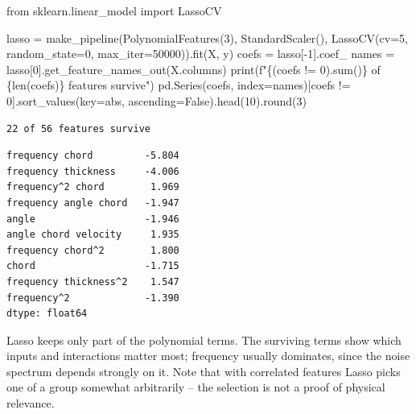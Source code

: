 \documentclass[
  letterpaper,
  DIV=11,
  numbers=noendperiod]{scrreprt}
\newenvironment{Shaded}{\begin{snugshade}}{\end{snugshade}}
\newcommand{\BuiltInTok}[1]{\textcolor[rgb]{0.00,0.23,0.31}{#1}}
\newcommand{\DecValTok}[1]{\textcolor[rgb]{0.68,0.00,0.00}{#1}}
\newcommand{\ImportTok}[1]{\textcolor[rgb]{0.00,0.46,0.62}{#1}}
\newcommand{\NormalTok}[1]{\textcolor[rgb]{0.00,0.23,0.31}{#1}}
\newcommand{\OperatorTok}[1]{\textcolor[rgb]{0.37,0.37,0.37}{#1}}
\newcommand{\SpecialCharTok}[1]{\textcolor[rgb]{0.37,0.37,0.37}{#1}}
\newcommand{\SpecialStringTok}[1]{\textcolor[rgb]{0.13,0.47,0.30}{#1}}
\newcommand{\VariableTok}[1]{\textcolor[rgb]{0.07,0.07,0.07}{#1}}
\begin{document}
\begin{tcolorbox}[enhanced jigsaw, left=2mm, title=\textcolor{quarto-callout-caution-color}{\faFire}\hspace{0.5em}{Solution to Exercise 6}, opacityback=0, breakable, rightrule=.15mm, arc=.35mm, toptitle=1mm, colbacktitle=quarto-callout-caution-color!10!white, opacitybacktitle=0.6, coltitle=black, colframe=quarto-callout-caution-color-frame, bottomrule=.15mm, leftrule=.75mm, bottomtitle=1mm, titlerule=0mm, toprule=.15mm, colback=white]

\begin{Shaded}
\begin{Highlighting}[]
\ImportTok{from}\NormalTok{ sklearn.linear\_model }\ImportTok{import}\NormalTok{ LassoCV}

\NormalTok{lasso }\OperatorTok{=}\NormalTok{ make\_pipeline(PolynomialFeatures(}\DecValTok{3}\NormalTok{), StandardScaler(),}
\NormalTok{                      LassoCV(cv}\OperatorTok{=}\DecValTok{5}\NormalTok{, random\_state}\OperatorTok{=}\DecValTok{0}\NormalTok{, max\_iter}\OperatorTok{=}\DecValTok{50000}\NormalTok{)).fit(X, y)}
\NormalTok{coefs }\OperatorTok{=}\NormalTok{ lasso[}\OperatorTok{{-}}\DecValTok{1}\NormalTok{].coef\_}
\NormalTok{names }\OperatorTok{=}\NormalTok{ lasso[}\DecValTok{0}\NormalTok{].get\_feature\_names\_out(X.columns)}
\BuiltInTok{print}\NormalTok{(}\SpecialStringTok{f"}\SpecialCharTok{\{}\NormalTok{(coefs }\OperatorTok{!=} \DecValTok{0}\NormalTok{)}\SpecialCharTok{.}\BuiltInTok{sum}\NormalTok{()}\SpecialCharTok{\}}\SpecialStringTok{ of }\SpecialCharTok{\{}\BuiltInTok{len}\NormalTok{(coefs)}\SpecialCharTok{\}}\SpecialStringTok{ features survive"}\NormalTok{)}
\NormalTok{pd.Series(coefs, index}\OperatorTok{=}\NormalTok{names)[coefs }\OperatorTok{!=} \DecValTok{0}\NormalTok{].sort\_values(key}\OperatorTok{=}\BuiltInTok{abs}\NormalTok{, ascending}\OperatorTok{=}\VariableTok{False}\NormalTok{).head(}\DecValTok{10}\NormalTok{).}\BuiltInTok{round}\NormalTok{(}\DecValTok{3}\NormalTok{)}
\end{Highlighting}
\end{Shaded}

\begin{verbatim}
22 of 56 features survive
\end{verbatim}

\begin{verbatim}
frequency chord         -5.804
frequency thickness     -4.006
frequency^2 chord        1.969
frequency angle chord   -1.947
angle                   -1.946
angle chord velocity     1.935
frequency chord^2        1.800
chord                   -1.715
frequency thickness^2    1.547
frequency^2             -1.390
dtype: float64
\end{verbatim}

Lasso keeps only part of the polynomial terms. The surviving terms show
which inputs and interactions matter most; frequency usually dominates,
since the noise spectrum depends strongly on it. Note that with
correlated features Lasso picks one of a group somewhat arbitrarily --
the selection is not a proof of physical relevance.

\end{tcolorbox}
\end{document}
